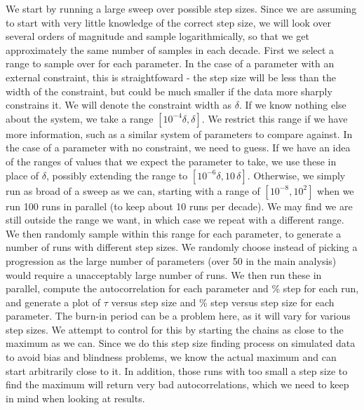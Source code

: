 We start by running a large sweep over possible step sizes.  Since we
are assuming to start with very little knowledge of the correct step
size, we will look over several orders of magnitude and sample
logarithmically, so that we get approximately the same number of
samples in each decade.  First we select a range to sample over for
each parameter.  In the case of a parameter with an external
constraint, this is straightfoward - the step size will be less than
the width of the constraint, but could be much smaller if the data
more sharply constrains it.  We will denote the constraint width as
$\delta$.  If we know nothing else about the system, we take a range
$[10^{-4}\delta,\delta]$.  We restrict this range if we have more
information, such as a similar system of parameters to compare
against.  In the case of a parameter with no constraint, we need to
guess.  If we have an idea of the ranges of values that we expect the
parameter to take, we use these in place of $\delta$, possibly
extending the range to $[10^{-6}\delta,10\,\delta]$.  Otherwise, we
simply run as broad of a sweep as we can, starting with a range of
$[10^{-8},10^{2}]$ when we run 100 runs in parallel (to keep about 10
runs per decade).  We may find we are still outside the range we want,
in which case we repeat with a different range.  We then randomly
sample within this range for each parameter, to generate a number of
runs with different step sizes.  We randomly choose instead of picking
a progression as the large number of parameters (over 50 in the main
analysis) would require a unacceptably large number of runs.  We then
run these in parallel, compute the autocorrelation for each parameter
and \% step for each run, and generate a plot of $\tau$ versus step
size and \% step versus step size for each parameter.  The burn-in
period can be a problem here, as it will vary for various step sizes.
We attempt to control for this by starting the chains as close to the
maximum as we can.  Since we do this step size finding process on
simulated data to avoid bias and blindness problems, we know the
actual maximum and can start arbitrarily close to it.  In addition,
those runs with too small a step size to find the maximum will return
very bad autocorrelations, which we need to keep in mind when looking
at results.

